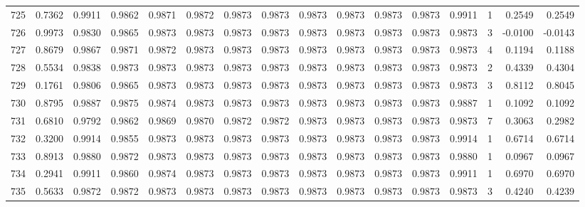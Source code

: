 \begin{tabular}{lrrrrrrrrrrrrrrr}
725 &      0.7362 &  0.9911 &  0.9862 &  0.9871 &  0.9872 &  0.9873 &  0.9873 &  0.9873 &  0.9873 &  0.9873 &   0.9873 &     0.9911 &      1 &                    0.2549 &                     0.2549 \\
726 &      0.9973 &  0.9830 &  0.9865 &  0.9873 &  0.9873 &  0.9873 &  0.9873 &  0.9873 &  0.9873 &  0.9873 &   0.9873 &     0.9873 &      3 &                   -0.0100 &                    -0.0143 \\
727 &      0.8679 &  0.9867 &  0.9871 &  0.9872 &  0.9873 &  0.9873 &  0.9873 &  0.9873 &  0.9873 &  0.9873 &   0.9873 &     0.9873 &      4 &                    0.1194 &                     0.1188 \\
728 &      0.5534 &  0.9838 &  0.9873 &  0.9873 &  0.9873 &  0.9873 &  0.9873 &  0.9873 &  0.9873 &  0.9873 &   0.9873 &     0.9873 &      2 &                    0.4339 &                     0.4304 \\
729 &      0.1761 &  0.9806 &  0.9865 &  0.9873 &  0.9873 &  0.9873 &  0.9873 &  0.9873 &  0.9873 &  0.9873 &   0.9873 &     0.9873 &      3 &                    0.8112 &                     0.8045 \\
730 &      0.8795 &  0.9887 &  0.9875 &  0.9874 &  0.9873 &  0.9873 &  0.9873 &  0.9873 &  0.9873 &  0.9873 &   0.9873 &     0.9887 &      1 &                    0.1092 &                     0.1092 \\
731 &      0.6810 &  0.9792 &  0.9862 &  0.9869 &  0.9870 &  0.9872 &  0.9872 &  0.9873 &  0.9873 &  0.9873 &   0.9873 &     0.9873 &      7 &                    0.3063 &                     0.2982 \\
732 &      0.3200 &  0.9914 &  0.9855 &  0.9873 &  0.9873 &  0.9873 &  0.9873 &  0.9873 &  0.9873 &  0.9873 &   0.9873 &     0.9914 &      1 &                    0.6714 &                     0.6714 \\
733 &      0.8913 &  0.9880 &  0.9872 &  0.9873 &  0.9873 &  0.9873 &  0.9873 &  0.9873 &  0.9873 &  0.9873 &   0.9873 &     0.9880 &      1 &                    0.0967 &                     0.0967 \\
734 &      0.2941 &  0.9911 &  0.9860 &  0.9874 &  0.9873 &  0.9873 &  0.9873 &  0.9873 &  0.9873 &  0.9873 &   0.9873 &     0.9911 &      1 &                    0.6970 &                     0.6970 \\
735 &      0.5633 &  0.9872 &  0.9872 &  0.9873 &  0.9873 &  0.9873 &  0.9873 &  0.9873 &  0.9873 &  0.9873 &   0.9873 &     0.9873 &      3 &                    0.4240 &                     0.4239 \\

\end{tabular}
